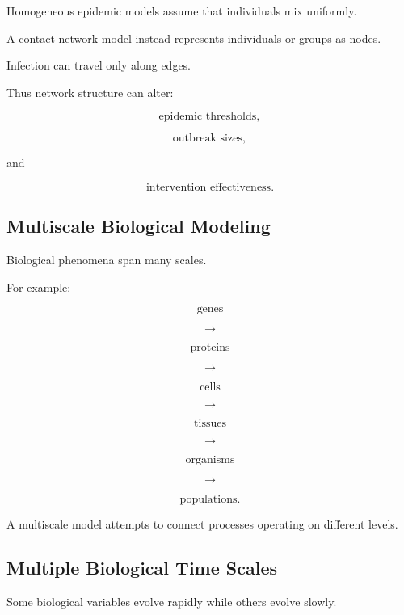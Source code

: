 Homogeneous epidemic models assume that individuals mix uniformly.

A contact-network model instead represents individuals or groups as nodes.

Infection can travel only along edges.

Thus network structure can alter:

\[
\boxed{
\text{epidemic thresholds},
}
\]

\[
\boxed{
\text{outbreak sizes},
}
\]

and

\[
\boxed{
\text{intervention effectiveness}.
}
\]

\subsection{Multiscale Biological Modeling}
\label{subsec:multiscale-biological-modeling}

Biological phenomena span many scales.

For example:

\[
\boxed{
\text{genes}
}
\]

\[
\longrightarrow
\]

\[
\boxed{
\text{proteins}
}
\]

\[
\longrightarrow
\]

\[
\boxed{
\text{cells}
}
\]

\[
\longrightarrow
\]

\[
\boxed{
\text{tissues}
}
\]

\[
\longrightarrow
\]

\[
\boxed{
\text{organisms}
}
\]

\[
\longrightarrow
\]

\[
\boxed{
\text{populations}.
}
\]

A multiscale model attempts to connect processes operating on different
levels.

\subsection{Multiple Biological Time Scales}
\label{subsec:biological-time-scales}

Some biological variables evolve rapidly while others evolve slowly.


